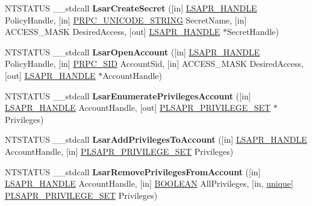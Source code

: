 \begin{DoxyCompactItemize}
\item 
\mbox{\label{interfacelsarpc_ac3f8b52b94b5284cb3e8418ec7a89a46}} 
N\+T\+S\+T\+A\+T\+US \+\_\+\+\_\+stdcall {\bfseries Lsar\+Create\+Secret} (\mbox{[}in\mbox{]} \hyperlink{interfacevoid}{L\+S\+A\+P\+R\+\_\+\+H\+A\+N\+D\+LE} Policy\+Handle, \mbox{[}in\mbox{]} \hyperlink{struct___r_p_c___u_n_i_c_o_d_e___s_t_r_i_n_g}{P\+R\+P\+C\+\_\+\+U\+N\+I\+C\+O\+D\+E\+\_\+\+S\+T\+R\+I\+NG} Secret\+Name, \mbox{[}in\mbox{]} A\+C\+C\+E\+S\+S\+\_\+\+M\+A\+SK Desired\+Access, \mbox{[}out\mbox{]} \hyperlink{interfacevoid}{L\+S\+A\+P\+R\+\_\+\+H\+A\+N\+D\+LE} $\ast$Secret\+Handle)
\item 
\mbox{\label{interfacelsarpc_a17bb28cee07b13399f2453b72b436eb0}} 
N\+T\+S\+T\+A\+T\+US \+\_\+\+\_\+stdcall {\bfseries Lsar\+Open\+Account} (\mbox{[}in\mbox{]} \hyperlink{interfacevoid}{L\+S\+A\+P\+R\+\_\+\+H\+A\+N\+D\+LE} Policy\+Handle, \mbox{[}in\mbox{]} \hyperlink{struct___r_p_c___s_i_d}{P\+R\+P\+C\+\_\+\+S\+ID} Account\+Sid, \mbox{[}in\mbox{]} A\+C\+C\+E\+S\+S\+\_\+\+M\+A\+SK Desired\+Access, \mbox{[}out\mbox{]} \hyperlink{interfacevoid}{L\+S\+A\+P\+R\+\_\+\+H\+A\+N\+D\+LE} $\ast$Account\+Handle)
\item 
\mbox{\label{interfacelsarpc_a650e65109769c4164f00b14e0de57d35}} 
N\+T\+S\+T\+A\+T\+US \+\_\+\+\_\+stdcall {\bfseries Lsar\+Enumerate\+Privileges\+Account} (\mbox{[}in\mbox{]} \hyperlink{interfacevoid}{L\+S\+A\+P\+R\+\_\+\+H\+A\+N\+D\+LE} Account\+Handle, \mbox{[}out\mbox{]} \hyperlink{struct___l_s_a_p_r___p_r_i_v_i_l_e_g_e___s_e_t}{P\+L\+S\+A\+P\+R\+\_\+\+P\+R\+I\+V\+I\+L\+E\+G\+E\+\_\+\+S\+ET} $\ast$Privileges)
\item 
\mbox{\label{interfacelsarpc_af31e456d0d5f5a21a7e2d0c82666594f}} 
N\+T\+S\+T\+A\+T\+US \+\_\+\+\_\+stdcall {\bfseries Lsar\+Add\+Privileges\+To\+Account} (\mbox{[}in\mbox{]} \hyperlink{interfacevoid}{L\+S\+A\+P\+R\+\_\+\+H\+A\+N\+D\+LE} Account\+Handle, \mbox{[}in\mbox{]} \hyperlink{struct___l_s_a_p_r___p_r_i_v_i_l_e_g_e___s_e_t}{P\+L\+S\+A\+P\+R\+\_\+\+P\+R\+I\+V\+I\+L\+E\+G\+E\+\_\+\+S\+ET} Privileges)
\item 
\mbox{\label{interfacelsarpc_ad60a5f3c1758e48aea8a65262ee4fc3d}} 
N\+T\+S\+T\+A\+T\+US \+\_\+\+\_\+stdcall {\bfseries Lsar\+Remove\+Privileges\+From\+Account} (\mbox{[}in\mbox{]} \hyperlink{interfacevoid}{L\+S\+A\+P\+R\+\_\+\+H\+A\+N\+D\+LE} Account\+Handle, \mbox{[}in\mbox{]} \hyperlink{_processor_bind_8h_a112e3146cb38b6ee95e64d85842e380a}{B\+O\+O\+L\+E\+AN} All\+Privileges, \mbox{[}in, \hyperlink{interfaceunique}{unique}\mbox{]} \hyperlink{struct___l_s_a_p_r___p_r_i_v_i_l_e_g_e___s_e_t}{P\+L\+S\+A\+P\+R\+\_\+\+P\+R\+I\+V\+I\+L\+E\+G\+E\+\_\+\+S\+ET} Privileges)

\end{DoxyCompactItemize}
